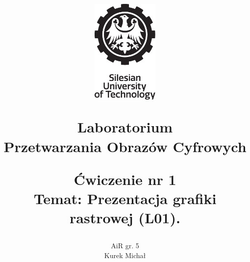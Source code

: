 \title{
\vspace{-4.0cm}
\begin{flushright}
    \includegraphics[width=1.3in]{./../src/logo/en/polsl_logo2_zn_en.pdf}\\
\end{flushright}
\vspace*{3.3cm}
{\fontsize{24}{30}\selectfont\textbf{Laboratorium \\ Przetwarzania Obrazów Cyfrowych}}\\
\vspace*{4.5cm}

{\fontsize{14}{0}\selectfont 
Ćwiczenie nr 1 \\[-1.2em] 
Temat: Prezentacja grafiki rastrowej (L01).
}
\vspace*{4.5cm} %
}
\author{
\begin{minipage}{1\linewidth}
    \begin{flushright}
        {\begin{minipage}[t]{.28\linewidth}
            AiR gr. 5 \\
            Kurek Michał
        \end{minipage}}
    \end{flushright}
\end{minipage}
\vspace*{1.4cm}
}

